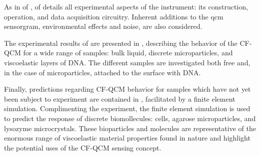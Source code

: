 As in  of ,
 of  details all experimental
aspects of the instrument: its construction, operation, and data
acquisition circuitry.  Inherent additions to the \gls{qcm} sensorgram,
environmental effects and noise, are also considered.

The experimental results of  are presented in
, describing the behavior of the CF-QCM for a
wide range of samples: bulk liquid, discrete microparticles, and
viscoelastic layers of DNA\@.  The different samples are investigated both
free and, in the case of microparticles, attached to the surface with
DNA\@.

Finally, predictions regarding CF-QCM behavior for samples which have not yet
been subject to experiment are contained in ,
facilitated by a finite element simulation.  Complimenting the experiment, the
finite element simulation is used to predict the response of discrete
biomollecules: cells, agarose microparticles, and lysozyme microcrystals.
These bioparticles and molecules are representative of the enormous range of
viscoelastic material properties found in nature and highlight the potential
uses of the CF-QCM sensing concept.
